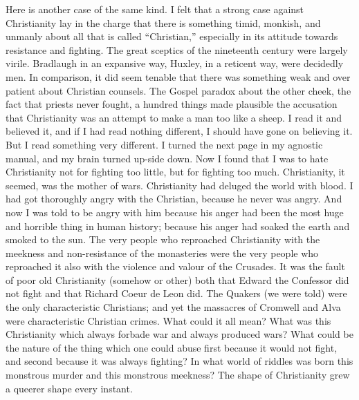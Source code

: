 Here is another case of the same kind. I felt that a strong case against Christianity lay in the charge that there is something timid, monkish, and unmanly about all that is called “Christian,” especially in its attitude towards resistance and fighting. The great sceptics of the nineteenth century were largely virile. Bradlaugh in an expansive way, Huxley, in a reticent way, were decidedly men. In comparison, it did seem tenable that there was something weak and over patient about Christian counsels. The Gospel paradox about the other cheek, the fact that priests never fought, a hundred things made plausible the accusation that Christianity was an attempt to make a man too like a sheep. I read it and believed it, and if I had read nothing different, I should have gone on believing it. But I read something very different. I turned the next page in my agnostic manual, and my brain turned up-side down. Now I found that I was to hate Christianity not for fighting too little, but for fighting too much. Christianity, it seemed, was the mother of wars. Christianity had deluged the world with blood. I had got thoroughly angry with the Christian, because he never was angry. And now I was told to be angry with him because his anger had been the most huge and horrible thing in human history; because his anger had soaked the earth and smoked to the sun. The very people who reproached Christianity with the meekness and non-resistance of the monasteries were the very people who reproached it also with the violence and valour of the Crusades. It was the fault of poor old Christianity (somehow or other) both that Edward the Confessor did not fight and that Richard Coeur de Leon did. The Quakers (we were told) were the only characteristic Christians; and yet the massacres of Cromwell and Alva were characteristic Christian crimes. What could it all mean? What was this Christianity which always forbade war and always produced wars? What could be the nature of the thing which one could abuse first because it would not fight, and second because it was always fighting? In what world of riddles was born this monstrous murder and this monstrous meekness? The shape of Christianity grew a queerer shape every instant.

